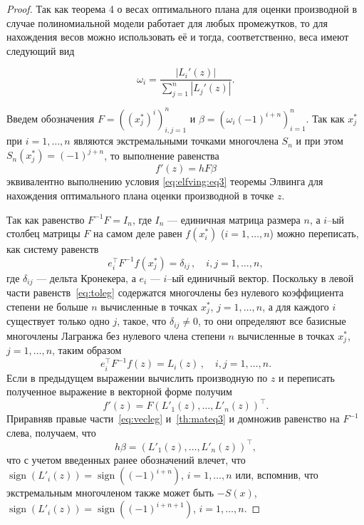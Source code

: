 \documentclass[specialist,
               substylefile = spbu.rtx,
               subf,href,colorlinks=true, 12pt]{disser}
\theoremstyle{definition}
\DeclareMathOperator*{\sign}{sign}
\newcommand\abs[1]{\left\lvert#1\right\rvert}
\begin{document}
\begin{proof}
	Так как теорема 4 о весах оптимального плана для оценки производной в случае полиномиальной модели работает для любых промежутков, то для нахождения весов можно использовать её и тогда, соответственно, веса имеют следующий вид
	
	\begin{equation*}
		\omega_i = \frac{\abs{L_i'(z)}}{\sum_{j=1}^n \abs{L_j'(z)}}.
	\end{equation*}
	
	Введем обозначения $F = \left((x_j^*)^i\right)^n_{i, j = 1}$ и $\beta = \left( \omega_i (-1)^{i+n} \right)_{i=1}^n$. Так как $x_j^*$ при $i = 1, \ldots , n$ являются экстремальными точками многочлена $S_n$ и при этом $S_n(x_j^*) = (-1)^{j+n}$, то выполнение равенства 
	\begin{equation}
		\label{th:mateq3}
		f'(z) = hF\beta
	\end{equation}
	 эквивалентно выполнению условия \eqref{eq:elfving:eq3} теоремы Элвинга для нахождения оптимального плана оценки производной в точке $z$.
	 
	Так как равенство $F^{-1}F = I_n$, где $I_n$ --- единичная матрица размера $n$, а $i$--ый столбец матрицы $F$ на самом деле равен $f(x_i^*)$ ($i = 1, \ldots, n$) можно переписать, как систему равенств
	\begin{equation*}
		e_i^{\top} F^{-1} f(x_j^*) = \delta_{ij} \, , \quad i, j = 1, \ldots , n ,
	\end{equation*}
	где $\delta_{ij}$ --- дельта Кронекера, а $e_i$ --- $i$--ый единичный вектор. Поскольку в левой части равенств~\eqref{eq:toleg} содержатся многочлены без нулевого коэффициента степени не больше $n$ вычисленные в точках $x_j^*$, $j=1, \ldots , n$, а для каждого $i$ существует только одно $j$, такое, что $\delta_{ij} \neq 0$, то они определяют все базисные многочлены Лагранжа без нулевого члена степени $n$ вычисленные в точках $x_j^*$, $j=1, \ldots , n$, таким образом
	\begin{equation*}
		e_i^{\top} F^{-1} f(z) = L_i(z) \, , \quad i, j = 1, \ldots , n .
	\end{equation*}
	Если в предыдущем выражении вычислить производную по $z$ и переписать полученное выражение в векторной форме получим
	\begin{equation}
		\label{eq:vecleg}
		f'(z) = F \left( L'_1(z), \ldots, L'_n(z) \right)^\top.
	\end{equation}
	Приравняв правые части~\eqref{eq:vecleg} и~\eqref{th:mateq3} и домножив равенство на $F^{-1}$ слева, получаем, что
	\begin{equation*}
		h \beta = \left( L'_1(z), \ldots, L'_n(z) \right)^\top,
	\end{equation*}
	что с учетом введенных ранее обозначений влечет, что $\sign (L'_i(z)) = \sign((-1)^{i+n}) $, $i = 1, \ldots, n$ или, вспомнив, что экстремальным многочленом также может быть $-S(x)$,  $\sign (L'_i(z)) = \sign((-1)^{i+n+1}) $, $i = 1, \ldots, n$.
	

\end{proof}
\end{document}
